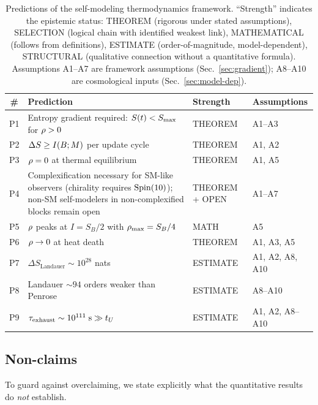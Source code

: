 \begin{table}[t]
\caption{Predictions of the self-modeling thermodynamics framework.
``Strength'' indicates the epistemic status: THEOREM
(rigorous under stated assumptions), SELECTION (logical chain with
identified weakest link), MATHEMATICAL (follows from definitions),
ESTIMATE (order-of-magnitude, model-dependent), STRUCTURAL
(qualitative connection without a quantitative formula).
Assumptions A1--A7 are framework assumptions
(Sec.~\ref{sec:gradient}); A8--A10 are cosmological inputs
(Sec.~\ref{sec:model-dep}).
\label{tab:predictions}}
\begin{tabular}{@{}clll@{}}
  \toprule
  \# & Prediction & Strength & Assumptions \\
  \midrule
  P1 & Entropy gradient required: $S(t) < S_{\max}$ for $\rho > 0$
     & THEOREM & A1--A3 \\
  P2 & $\Delta S \geq I(B;M)$ per update cycle
     & THEOREM & A1, A2 \\
  P3 & $\rho = 0$ at thermal equilibrium
     & THEOREM & A1, A5 \\
  P4 & Complexification necessary for SM-like observers (chirality requires $\mathrm{Spin}(10)$);
       non-SM self-modelers in non-complexified blocks remain open
     & THEOREM + OPEN & A1--A7 \\
  P5 & $\rho$ peaks at $I = S_B/2$ with $\rho_{\max} = S_B/4$
     & MATH & A5 \\
  P6 & $\rho \to 0$ at heat death
     & THEOREM & A1, A3, A5 \\
  \midrule
  P7 & $\Delta S_{\mathrm{Landauer}} \sim 10^{28}$ nats
     & ESTIMATE & A1, A2, A8, A10 \\
  P8 & Landauer $\sim 94$ orders weaker than Penrose
     & ESTIMATE & A8--A10 \\
  P9 & $\tau_{\mathrm{exhaust}}\sim 10^{111}\;\text{s}\gg t_U$
     & ESTIMATE & A1, A2, A8--A10 \\
  \bottomrule
\end{tabular}
\end{table}

\subsection{Non-claims}\label{sec:non-claims}

To guard against overclaiming, we state explicitly what the
quantitative results do \emph{not} establish.

